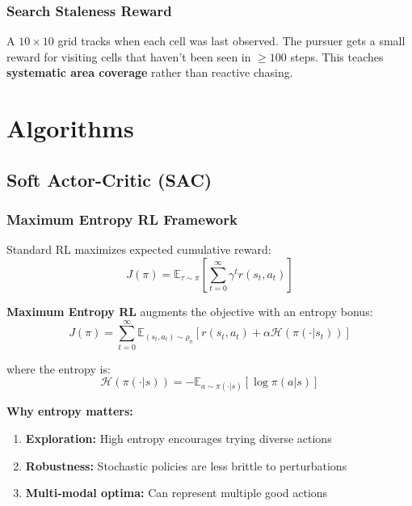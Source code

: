 \documentclass[11pt,a4paper]{report}
\begin{document}
\subsection{Search Staleness Reward}
A $10 \times 10$ grid tracks when each cell was last observed. The pursuer gets a small reward for visiting cells that haven't been seen in $\geq 100$ steps. This teaches \textbf{systematic area coverage} rather than reactive chasing.

\chapter{Algorithms}
\label{chap:algorithms}

\section{Soft Actor-Critic (SAC)}

\subsection{Maximum Entropy RL Framework}

Standard RL maximizes expected cumulative reward:
\begin{equation}
    J(\pi) = \mathbb{E}_{\tau \sim \pi}\left[ \sum_{t=0}^{\infty} \gamma^t r(s_t, a_t) \right]
\end{equation}

\textbf{Maximum Entropy RL} augments the objective with an entropy bonus:
\begin{equation}
    J(\pi) = \sum_{t=0}^{\infty} \mathbb{E}_{(s_t, a_t) \sim \rho_\pi} \left[ r(s_t, a_t) + \alpha \mathcal{H}(\pi(\cdot | s_t)) \right]
\end{equation}

where the entropy is:
\begin{equation}
    \mathcal{H}(\pi(\cdot | s)) = -\mathbb{E}_{a \sim \pi(\cdot|s)}[\log \pi(a|s)]
\end{equation}

\textbf{Why entropy matters:}
\begin{enumerate}
    \item \textbf{Exploration:} High entropy encourages trying diverse actions
    \item \textbf{Robustness:} Stochastic policies are less brittle to perturbations
    \item \textbf{Multi-modal optima:} Can represent multiple good actions
\end{enumerate}
\end{document}
